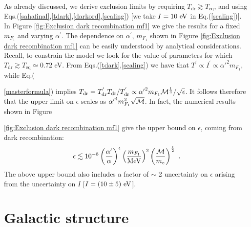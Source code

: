 \documentclass[12pt]{article}
\begin{document}
As already discussed, we derive exclusion limits by requiring $T
_{\text{dr}} \gtrsim T _{\text{eq}}$, and using
Eqs.(\ref{sahafinal},\ref{tdark},\ref{darkord},\ref{scaling}) [we take
$I = 10 \ {\rm eV}$ in Eq.(\ref{scaling})]. In Figure \ref{fig:Exclusion
dark recombination mf1} we give the results for a fixed $m _{F_1}$ and
varying $\alpha ^{'}$. The dependence on $\alpha ^{'}$, $m _{F_1}$ shown
in Figure \ref{fig:Exclusion dark recombination mf1} can be easily
understood by analytical considerations. Recall, to constrain the model
we look for the value of parameters for which $T _{\text{dr}} \gtrsim T
_{\text{eq}} \simeq 0.72$ eV. From Eqs.(\ref{tdark},\ref{scaling}) we
have that $T ^{'} \propto I ^{'} \propto {\alpha '} ^2 m _{F_1}$, while
Eq.({\ref{masterformula}) implies $T _{\text{dr}} = T _{\text{dr}} ^{'}T
_{\text{dr}}/T _{\text{dr}} ^{'} \propto {\alpha '} ^2m _{F_1}{\cal M}
^{\frac{1}{4}}/\sqrt{\epsilon}$. It follows therefore that the upper
limit on $\epsilon$ scales as ${\alpha '} ^4 m _{F_1} ^2\sqrt{\cal M}$.
In fact, the numerical results shown in Figure {\ref{fig:Exclusion dark
recombination mf1} give the upper bound on $\epsilon$, coming from dark
recombination:
%
\begin{eqnarray}
\epsilon \lesssim 10 ^{-8} \left ( \frac{\alpha '}{\alpha} \right ) ^4
\left ( \frac{m _{F_1}}{\rm MeV} \right ) ^2 \left ( \frac{{\cal M}}{m
_e} \right ) ^{\frac{1}{2}} \ .
\label{boundse}
\end{eqnarray}
% 
The above upper bound also includes a factor of $\sim$ 2 uncertainty on
$\epsilon$ arising from the uncertainty on $I$ [$I = (10 \pm 5) \ {\rm
eV}$].

\section{Galactic structure}

}}
\end{document}
